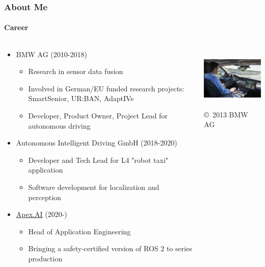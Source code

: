 \begin{frame}
\frametitle{About Me}
\framesubtitle{Career}
\begin{columns}[T]
    \begin{column}{.66\textwidth}
    \begin{itemize}
        \item BMW AG (2010-2018)
            \begin{itemize}
                \item Research in sensor data fusion
                \item Involved in German/EU funded research projects:
                    SmartSenior, UR:BAN, AdaptIVe
                \item Developer, Product Owner, Project Lead for autonomous driving
            \end{itemize}
        \item Autonomous Intelligent Driving GmbH (2018-2020)
            \begin{itemize}
                \item Developer and Tech Lead for L4 "robot taxi" application
                \item Software development for localization and perception
            \end{itemize}
        \item \href{https://www.apex.ai/}{Apex.AI} (2020-)
            \begin{itemize}
                \item Head of Application Engineering
                \item Bringing a safety-certified version of ROS 2 to series
                    production
            \end{itemize}
    \end{itemize}
    \end{column}
    \begin{column}{.34\textwidth}
    \centering
    \includegraphics[height=3.0cm]{images/michael-aeberhard-bmw.jpg}\\
    \tiny \copyright \, 2013 BMW AG
    \end{column}
\end{columns}
\end{frame}